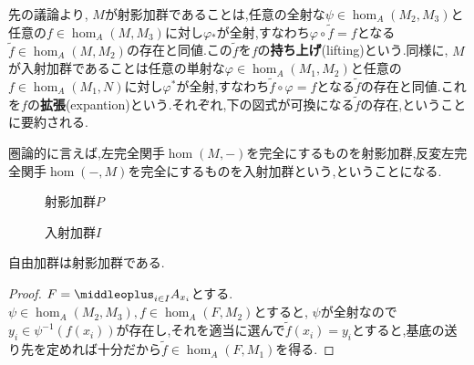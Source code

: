 先の議論より, $M$が射影加群であることは,任意の全射な$\psi\in\hom_A(M_2,M_3)$と任意の$f\in\hom_A(M,M_3)$に対し$\varphi{}_\ast $が全射,すなわち$\varphi\circ\widetilde{f}=f$となる$\widetilde{f}\in\hom_A(M,M_2)$の存在と同値.この$\widetilde{f}$を$f$の\textbf{持ち上げ}(lifting)という.同様に, $M$が入射加群であることは任意の単射な$\varphi\in\hom_A(M_1,M_2)$と任意の$f\in\hom_A(M_1,N)$に対し$\varphi^\ast $が全射,すなわち$\widetilde{f}\circ\varphi=f$となる$\widetilde{f}$の存在と同値.これを$f$の\textbf{拡張}(expantion)という.それぞれ,下の図式が可換になる$\widetilde{f}$の存在,ということに要約される.

圏論的に言えば,左完全関手$\hom(M,-)$を完全にするものを射影加群,反変左完全関手$\hom(-,M)$を完全にするものを入射加群という,ということになる.

\begin{minipage}{.45\hsize}
	\begin{figure}[H]
		\centering
		\caption{射影加群$P$}
	\end{figure}
\end{minipage}
\hfill
\begin{minipage}{.45\hsize}
	\begin{figure}[H]
		\centering
		\caption{入射加群$I$}
	\end{figure}
\end{minipage}

\begin{prop}\label{prop:自由加群は射影加群}
	自由加群は射影加群である.
\end{prop}
\begin{proof}
	$F=\middleoplus_{i\in I}A_{x_i}$とする. $\psi\in\hom_A(M_2,M_3),f\in\hom_A(F,M_2)$とすると, $\psi$が全射なので$y_i\in\psi^{-1}(f(x_i))$が存在し,それを適当に選んで$\widetilde{f}(x_i)=y_i$とすると,基底の送り先を定めれば十分だから$\widetilde{f}\in\hom_A(F,M_1)$を得る.
\end{proof}

